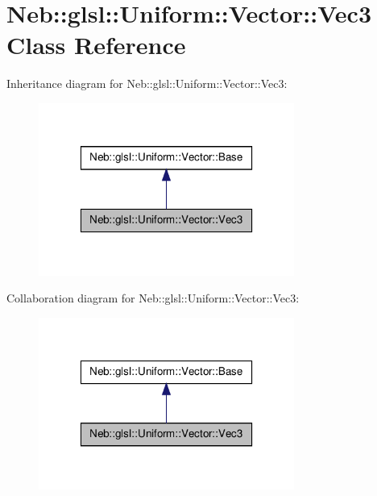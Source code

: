 \hypertarget{classNeb_1_1glsl_1_1Uniform_1_1Vector_1_1Vec3}{\section{\-Neb\-:\-:glsl\-:\-:\-Uniform\-:\-:\-Vector\-:\-:\-Vec3 \-Class \-Reference}
\label{classNeb_1_1glsl_1_1Uniform_1_1Vector_1_1Vec3}
}


\-Inheritance diagram for \-Neb\-:\-:glsl\-:\-:\-Uniform\-:\-:\-Vector\-:\-:\-Vec3\-:\nopagebreak
\begin{figure}[H]
\begin{center}
\leavevmode
\includegraphics[width=238pt]{classNeb_1_1glsl_1_1Uniform_1_1Vector_1_1Vec3__inherit__graph}
\end{center}
\end{figure}


\-Collaboration diagram for \-Neb\-:\-:glsl\-:\-:\-Uniform\-:\-:\-Vector\-:\-:\-Vec3\-:\nopagebreak
\begin{figure}[H]
\begin{center}
\leavevmode
\includegraphics[width=238pt]{classNeb_1_1glsl_1_1Uniform_1_1Vector_1_1Vec3__coll__graph}
\end{center}
\end{figure}
